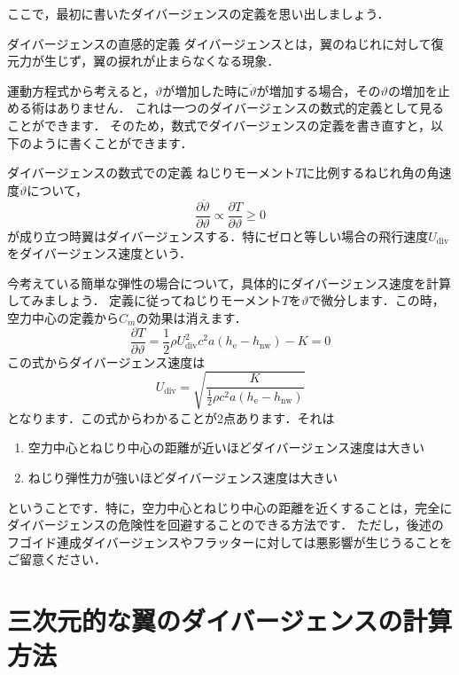 \documentclass{jarticle}
\begin{document}
ここで，最初に書いたダイバージェンスの定義を思い出しましょう．
\begin{itembox}[l]{ダイバージェンスの直感的定義}
    ダイバージェンスとは，翼のねじれに対して復元力が生じず，翼の捩れが止まらなくなる現象．
\end{itembox}
運動方程式から考えると，$\vartheta$が増加した時に$\ddot{\vartheta}$が増加する場合，その$\vartheta$の増加を止める術はありません．
これは一つのダイバージェンスの数式的定義として見ることができます．
そのため，数式でダイバージェンスの定義を書き直すと，以下のように書くことができます．
\begin{itembox}[l]{ダイバージェンスの数式での定義}
    ねじりモーメント$T$に比例するねじれ角の角速度$\ddot{\vartheta}$について，
    \begin{equation*}
        \frac{\partial \ddot{\vartheta}}{\partial \vartheta} \propto \frac{\partial T}{\partial \vartheta} \geq 0
    \end{equation*}
    が成り立つ時翼はダイバージェンスする．特にゼロと等しい場合の飛行速度$U_\mathrm{div}$をダイバージェンス速度という．
\end{itembox}

今考えている簡単な弾性の場合について，具体的にダイバージェンス速度を計算してみましょう．
定義に従ってねじりモーメント$T$を$\vartheta$で微分します．この時，空力中心の定義から$C_m$の効果は消えます．
\begin{equation}\label{Tv}
    \frac{\partial T}{\partial \vartheta} = \frac{1}{2}\rho U_\mathrm{div}^2 c^2 a  (h_\mathrm{e}-h_\mathrm{nw}) - K = 0
\end{equation}
この式からダイバージェンス速度は
\begin{equation}
    U_\mathrm{div} = \sqrt{\frac{K}{\frac{1}{2}\rho c^2 a  (h_\mathrm{e}-h_\mathrm{nw})}}
\end{equation}
となります．この式からわかることが2点あります．それは
\begin{enumerate}
    \item 空力中心とねじり中心の距離が近いほどダイバージェンス速度は大きい
    \item ねじり弾性力が強いほどダイバージェンス速度は大きい
\end{enumerate}
ということです．特に，空力中心とねじり中心の距離を近くすることは，完全にダイバージェンスの危険性を回避することのできる方法です．
ただし，後述のフゴイド連成ダイバージェンスやフラッターに対しては悪影響が生じうることをご留意ください．

\section{三次元的な翼のダイバージェンスの計算方法}
\end{document}
